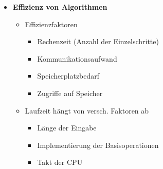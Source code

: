 \begin{itemize}
        \item \textbf{Effizienz von Algorithmen}
            \begin{itemize}
                \item Effizienzfaktoren
                    \begin{itemize}
                        \item Rechenzeit (Anzahl der Einzelschritte)
                        \item Kommunikationsaufwand 
                        \item Speicherplatzbedarf
                        \item Zugriffe auf Speicher
                    \end{itemize}
                \item Laufzeit hängt von versch. Faktoren ab
                    \begin{itemize}
                        \item Länge der Eingabe
                        \item Implementierung der Basisoperationen
                        \item Takt der CPU 
                    \end{itemize}
            \end{itemize}

    \end{itemize}


